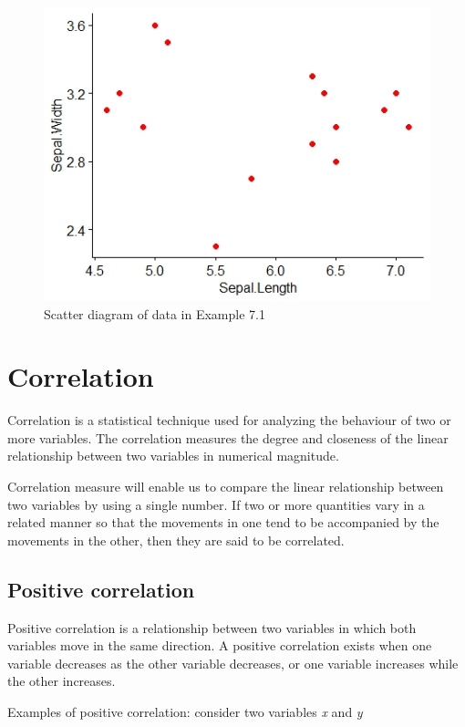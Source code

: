 \documentclass[
]{book}
\begin{document}
\begin{figure}

{\centering \includegraphics[width=0.5\linewidth]{images/image2c} 

}

\caption{Scatter diagram of data in Example 7.1}\label{fig:c1}
\end{figure}

\hypertarget{correlation}{%
\section{Correlation}\label{correlation}}

Correlation is a statistical technique used for analyzing the behaviour
of two or more variables. The correlation measures the degree and
closeness of the linear relationship between two variables in
numerical magnitude.

Correlation measure will enable us to compare the linear relationship
between two variables by using a single number. If two or more
quantities vary in a related manner so that the movements in one tend to
be accompanied by the movements in the other, then they are said to be
correlated.

\hypertarget{positive-correlation}{%
\subsection{Positive correlation}\label{positive-correlation}}

Positive correlation is a relationship between two variables in
which both variables move in the same direction. A positive correlation
exists when one variable decreases as the other variable decreases, or
one variable increases while the other increases.

Examples of positive correlation: consider two variables \emph{x} and \emph{y}
\end{document}
